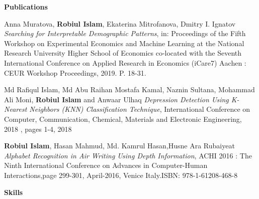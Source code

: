 \documentclass[letterpaper,10pt]{article}
\newcommand{\resitem}[1]{\item #1 \vspace{-2pt}}
\newcommand{\resheading}[1]{{\large \colorbox{mygrey}{\begin{minipage}{\textwidth}{\textbf{#1 \vphantom{p\^{E}}}}\end{minipage}}}}
\begin{document}
\resheading{Publications}
\begin{thebibliography}{}


\bibitem{}
Anna Muratova, \textbf{Robiul Islam}, Ekaterina Mitrofanova, Dmitry I. Ignatov \emph{Searching for Interpretable Demographic Patterns}, in: Proceedings of the Fifth Workshop on Experimental Economics and Machine Learning at the National Research University Higher School of Economics co-located with the Seventh International Conference on Applied Research in Economics (iCare7) Aachen : CEUR Workshop Proceedings, 2019. P. 18-31.

\bibitem{}
Md Rafiqul Islam, Md Abu Raihan Mostafa Kamal, Naznin Sultana, Mohammad Ali Moni, \textbf{Robiul Islam} and Anwaar Ulhaq \emph{Depression Detection Using K-Nearest Neighbors (KNN) Classification Technique}, International Conference on Computer, Communication, Chemical, Materials and Electronic Engineering, 2018 , pages 1-4, 2018  

\bibitem{}
\textbf{Robiul Islam}, Hasan Mahmud, Md. Kamrul Hasan,Husne Ara Rubaiyeat \emph{Alphabet Recognition in Air Writing Using Depth Information}, ACHI 2016 : The Ninth International Conference on Advances in Computer-Human Interactions,page 299-301, April-2016, Venice Italy.ISBN: 978-1-61208-468-8

\end{thebibliography}







\resheading{Skills}
\end{document}
